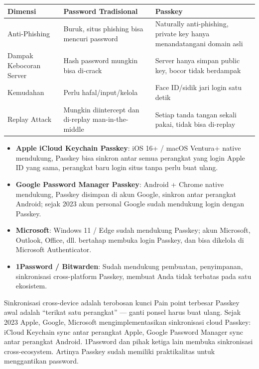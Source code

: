 \begin{center}
\begin{tabularx}{\linewidth}{|X|X|X|}
\hline
\textbf{Dimensi} & \textbf{Password Tradisional} & \textbf{Passkey} \tabularnewline
\hline
Anti-Phishing & Buruk, situs phishing bisa mencuri password & Naturally anti-phishing, private key hanya menandatangani domain asli \tabularnewline
Dampak Kebocoran Server & Hash password mungkin bisa di-crack & Server hanya simpan public key, bocor tidak berdampak \tabularnewline
Kemudahan & Perlu hafal/input/kelola & Face ID/sidik jari login satu detik \tabularnewline
Replay Attack & Mungkin diintercept dan di-replay man-in-the-middle & Setiap tanda tangan sekali pakai, tidak bisa di-replay \tabularnewline
\hline
\end{tabularx}
\end{center}


\begin{itemize}
  \item \textbf{Apple iCloud Keychain Passkey}: iOS 16+ / macOS Ventura+ native mendukung, Passkey bisa sinkron antar semua perangkat yang login Apple ID yang sama, perangkat baru login situs tanpa perlu buat ulang.
  \item \textbf{Google Password Manager Passkey}: Android + Chrome native mendukung, Passkey disimpan di akun Google, sinkron antar perangkat Android; sejak 2023 akun personal Google sudah mendukung login dengan Passkey.
  \item \textbf{Microsoft}: Windows 11 / Edge sudah mendukung Passkey; akun Microsoft, Outlook, Office, dll. bertahap membuka login Passkey, dan bisa dikelola di Microsoft Authenticator.
  \item \textbf{1Password / Bitwarden}: Sudah mendukung pembuatan, penyimpanan, sinkronisasi cross-platform Passkey, membuat Anda tidak terbatas pada satu ekosistem.
\end{itemize}

\begin{tcbinfo}{Sinkronisasi cross-device adalah terobosan kunci}
Pain point terbesar Passkey awal adalah “terikat satu perangkat” — ganti ponsel harus buat ulang. Sejak 2023 Apple, Google, Microsoft mengimplementasikan sinkronisasi cloud Passkey: iCloud Keychain sync antar perangkat Apple, Google Password Manager sync antar perangkat Android. 1Password dan pihak ketiga lain membuka sinkronisasi cross-ecosystem. Artinya Passkey sudah memiliki praktikalitas untuk menggantikan password.

\end{tcbinfo}

